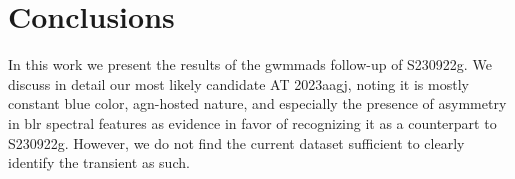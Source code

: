 \documentclass[twocolumn]{aastex631}
\newcommand{\gweventid}{S230922g\xspace}
\begin{document}


\section{Conclusions}
\label{sec:conclusions}

In this work we present the results of the \gls{gwmmads} follow-up of \gweventid.
We discuss in detail our most likely candidate AT 2023aagj, noting it is mostly constant blue color, \gls{agn}-hosted nature, and especially the presence of asymmetry in \gls{blr} spectral features as evidence in favor of recognizing it as a counterpart to \gweventid.
However, we do not find the current dataset sufficient to clearly identify the transient as such.
\end{document}
